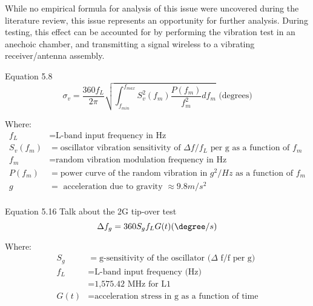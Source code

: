 While no empirical formula for analysis of this issue were uncovered during the literature review, this issue represents an opportunity for further analysis. During testing, this effect can be accounted for by performing the vibration test in an anechoic chamber, and transmitting a signal wireless to a vibrating receiver/antenna assembly. 


Equation 5.8
\begin{equation}
\sigma_v = \frac{360f_L}{2\pi}\sqrt{\int_{f_{min}}^{f_{max}} S^2_v(f_m) \frac{P(f_m)}{f^2_m} df_m}\text{ (degrees)}
\end{equation}

Where:
\begin{align*}
f_L &= \text{L-band input frequency in Hz} \\
S_v(f_m) &= \text{oscillator vibration sensitivity of } \Delta f/f_L \text{ per g as a function of } f_m \\
f_m &= \text{random vibration modulation frequency in Hz} \\
P(f_m) &= \text{power curve of the random vibration in } g^2/Hz \text{ as a function of } f_m \\
g &= \text{ acceleration due to gravity } \approx 9.8 m/s^2\\
\end{align*}


Equation 5.16
Talk about the 2G tip-over test
\begin{equation}
\Delta f_g = 360 S_g f_L G(t) (\degree/s)
\end{equation}

Where:
\begin{align*}
S_g &= \text{g-sensitivity of the oscillator } (\Delta \text{ f/f per g)}\\ 
f_L &= \text{L-band input frequency (Hz)}\\
&= \text{1,575.42 MHz for L1}\\
G(t) &= \text{acceleration stress in g as a function of time}
\end{align*}


